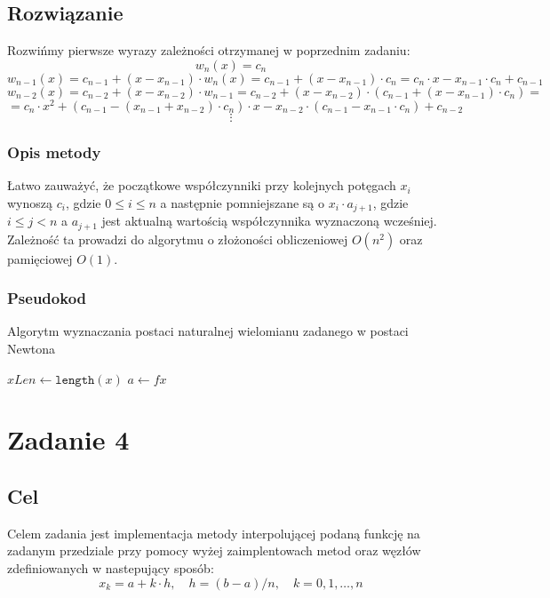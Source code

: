 \documentclass{article}
\begin{document}
\subsection{Rozwiązanie}
Rozwińmy pierwsze wyrazy zależności otrzymanej w poprzednim zadaniu:
\[
    w_n(x) = c_n
\]
\[
    w_{n-1}(x) = c_{n-1} + (x - x_{n-1}) \cdot w_n(x) = c_{n-1} + (x - x_{n-1}) \cdot c_n = c_n \cdot x - x_{n-1} \cdot c_n + c_{n-1} 
\]
\[
    w_{n-2}(x) = c_{n-2} + (x - x_{n-2}) \cdot w_{n-1} = c_{n-2} + (x - x_{n-2}) \cdot (c_{n-1} + (x - x_{n-1}) \cdot c_n) = 
\]
\[
    = c_n \cdot x^2 + (c_{n-1} - (x_{n-1} + x_{n-2}) \cdot c_n) \cdot x - x_{n-2} \cdot (c_{n-1} - x_{n-1} \cdot c_n) + c_{n-2}
\]
\[
    \vdots
\]
\subsubsection{Opis metody}
Łatwo zauważyć, że początkowe współczynniki przy kolejnych potęgach $x_i$ wynoszą $c_i$, gdzie $0 \leq i \leq n$ a następnie pomniejszane są o $x_i \cdot a_{j+1}$, gdzie $i \leq j < n$ a $a_{j+1}$ jest aktualną wartością współczynnika wyznaczoną wcześniej. Zależność ta prowadzi do algorytmu o złożoności obliczeniowej $O(n^2)$ oraz pamięciowej $O(1)$.


\subsubsection{Pseudokod}
\begin{algorithm}
    \caption{Algorytm wyznaczania postaci naturalnej wielomianu zadanego w postaci Newtona}
    \DontPrintSemicolon
    $xLen \gets \texttt{length}(x)$\;
    $a \gets fx$\;
    
\end{algorithm}

\section{Zadanie 4}
\subsection{Cel}
Celem zadania jest implementacja metody interpolującej podaną funkcję na zadanym przedziale
przy pomocy wyżej zaimplentowach metod oraz węzłów zdefiniowanych w nastepujący sposób:
\[
    x_k = a + k \cdot h, \quad h = (b - a) / n, \quad k = 0, 1, \ldots, n
\]
\end{document}
